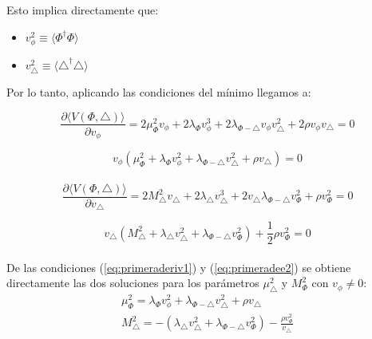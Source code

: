 \documentclass[12pt]{article}
\begin{document}
Esto implica directamente que: 

\begin{itemize}
    \item $v^{2}_\phi \equiv \langle \Phi^\dagger\Phi \rangle$
    \item $v^{2}_\triangle \equiv \langle \triangle^\dagger\triangle \rangle$
\end{itemize}

Por lo tanto, aplicando las condiciones del mínimo llegamos a: 

\begin{equation}
\label{eq:primeraderivate1}
    \frac{\partial{\langle V(\Phi, \triangle) }\rangle }{\partial v_\phi} =  2\mu^{2}_\Phi v_\phi + 2\lambda_\Phi v^{3}_\phi + 2 \lambda_{\Phi-\triangle} v_\phi v^{2}_\triangle +2\rho v_\phi v_\triangle  = 0 
\end{equation}


\begin{equation}
\label{eq:primeraderiv1}
      v_\phi(\mu^{2}_\Phi  + \lambda_\Phi v^{2}_\phi +  \lambda_{\Phi-\triangle} v^{2}_\triangle +\rho v_\triangle)  = 0
\end{equation} \\



\begin{equation}
\label{eq:primeraderivate2}
    \frac{\partial{\langle V(\Phi, \triangle) }\rangle }{\partial v_\triangle} =  2M^{2}_\triangle v_\triangle + 2\lambda_\triangle v^{3}_\triangle + 2v_\triangle \lambda_{\Phi-\triangle} v^{2}_\Phi + \rho v^{2}_\Phi = 0 
\end{equation}


\begin{equation}
\label{eq:primeradee2}
   v_\triangle( M^{2}_\triangle  + \lambda_\triangle v^{2}_\triangle +  \lambda_{\Phi-\triangle} v^{2}_\Phi) + \frac{1}{2}\rho v^{2}_\Phi = 0
\end{equation} \\

De las condiciones (\ref{eq:primeraderiv1}) y (\ref{eq:primeradee2})  se obtiene directamente las dos soluciones para los parámetros $ \mu_\triangle^2$ y $M_\Phi^2 $ con $v_\phi \neq 0 $:  \\


\begin{equation}
\begin{aligned}
\label{eq:solutionmu1}
\mu^{2}_\Phi = \lambda_\Phi v^{2}_\phi +  \lambda_{\Phi-\triangle} v^{2}_\triangle +\rho v_\triangle \\
M^{2}_\triangle = -(\lambda_\triangle v^{2}_\triangle +  \lambda_{\Phi-\triangle} v^{2}_\Phi) - \frac{\rho v^{2}_\Phi}{ v_\triangle} \end{aligned}
\end{equation} \\
\end{document}
